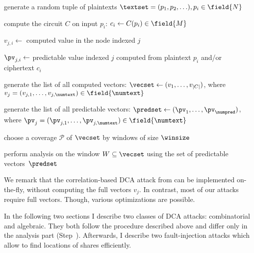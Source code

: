 \begin{algorithm}[ht]

\begin{algorithmic}[1]
    \State generate a random tuple of plaintexts $\textset = (p_1, p_2, \ldots), p_i \in \field{N}$
    
        \State compute the circuit $C$ on input $p_i$: $c_i \gets C(p_i) \in \field{M}$
        
            \State $v_{j,i} \gets$ computed value in the node indexed $j$
        \EndFor

            \State $\pv_{j,i} \gets$ predictable value indexed $j$ 
            \Statex \hspace{2.35cm} computed from plaintext $p_i$ and/or ciphertext $c_i$
        \EndFor
    \EndFor
    
    \State generate the list of all computed vectors:
    \Statex $\vecset \gets (v_1, \ldots, v_{|C|})$, where $v_j = (v_{j,1}, \ldots, v_{j,\numtext}) \in \field{\numtext}$
    
    \State generate the list of all predictable vectors:
    \Statex $\predset \gets (\pv_1, \ldots, \pv_{\numpred})$, where $\pv_j = (\pv_{j,1}, \ldots, \pv_{j,\numtext}) \in \field{\numtext}$ 
    
    \State choose a coverage $\mathcal{P}$ of $\vecset$ by windows of size $\winsize$
    
        \State{} perform analysis on the window $W \subseteq \vecset$
        \Statex \hspace{0.5cm} using the set of predictable vectors~$\predset$
    \EndFor
\end{algorithmic}
\end{algorithm}
We remark that the correlation-based DCA attack from \cite{AttackBos} can be implemented on-the-fly, without computing the full vectors $v_j$. In contrast, most of our attacks require full vectors. Though, various optimizations are possible.

In the following two sections I describe two classes of DCA attacks: combinatorial and algebraic. They both follow the procedure described above and differ only in the analysis part (Step~). Afterwards, I describe two fault-injection attacks which allow to find locations of shares efficiently.